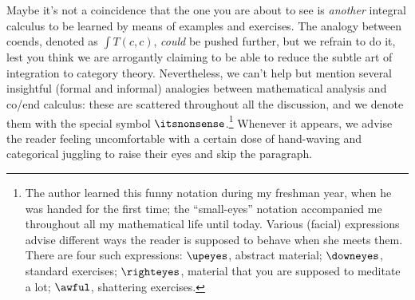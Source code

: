 Maybe it's not a coincidence that the one you are about to see is \emph{another} integral calculus to be learned by means of examples and exercises. The analogy between coends, denoted as $\int T(c,c)$, \emph{could} be pushed further, but we refrain to do it, lest you think we are arrogantly claiming to be able to reduce the subtle art of integration to category theory. Nevertheless, we can't help but mention several insightful (formal and informal) analogies between mathematical analysis and co/end calculus: these are scattered throughout all the discussion, and we denote them with the special symbol $\itsnonsense$.\footnote{The author learned this funny notation during my freshman year, when he was handed \cite{de1996analisi} for the first time; the ``small\hyp{}eyes'' notation accompanied me throughout all my mathematical life until today. Various (facial) expressions advise different ways the reader is supposed to behave when she meets them. There are four such expressions: $\upeyes$, abstract material; $\downeyes$, standard exercises; $\righteyes$, material that you are supposed to meditate a lot; $\awful$, shattering exercises.} Whenever it appears, we advise the reader feeling uncomfortable with a certain dose of hand-waving and categorical juggling to raise their eyes and skip the paragraph.




